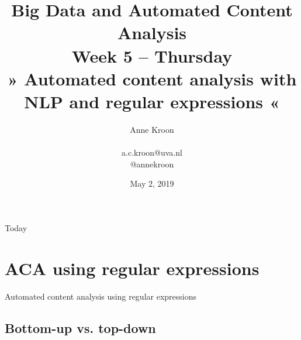 \documentclass{beamer}
\begin{document}
\title[Big Data and Automated Content Analysis]{\textbf{Big Data and Automated Content Analysis} \\ Week 5 -- Thursday \\ » Automated content analysis with NLP and regular expressions «}
\author[Anne Kroon]{Anne Kroon \\ ~ \\ \footnotesize{a.c.kroon@uva.nl \\@annekroon} \\}
\date{May 2, 2019}

\begin{frame}{}
\titlepage
\end{frame}

\begin{frame}{Today}
\tableofcontents
\end{frame}



\section[Regular expressions]{ACA using regular expressions}

\begin{frame}
Automated content analysis using regular expressions
\end{frame}


\subsection{Bottom-up vs. top-down}
\end{document}
